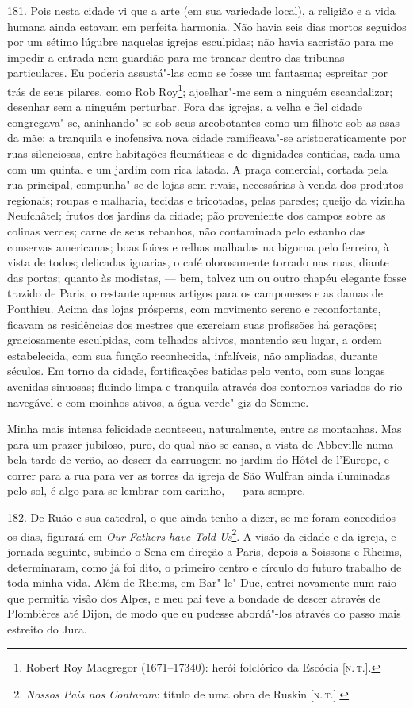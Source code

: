 181. Pois nesta cidade vi que a arte (em sua variedade local), a
religião e a vida humana ainda estavam em perfeita harmonia. Não havia
seis dias mortos seguidos por um sétimo lúgubre naquelas igrejas
esculpidas; não havia sacristão para me impedir a entrada nem guardião
para me trancar dentro das tribunas particulares. Eu poderia assustá"-las
como se fosse um fantasma; espreitar por trás de seus pilares, como Rob
Roy\footnote{Robert Roy Macgregor (1671--17340): herói folclórico da
  Escócia {[}\textsc{n.\,t.}{]}.}; ajoelhar"-me sem a ninguém escandalizar;
desenhar sem a ninguém perturbar. Fora das igrejas, a velha e fiel
cidade congregava"-se, aninhando"-se sob seus arcobotantes como um filhote
sob as asas da mãe; a tranquila e inofensiva nova cidade ramificava"-se
aristocraticamente por ruas silenciosas, entre habitações fleumáticas e
de dignidades contidas, cada uma com um quintal e um jardim com rica
latada. A praça comercial, cortada pela rua principal, compunha"-se de
lojas sem rivais, necessárias à venda dos produtos regionais; roupas e
malharia, tecidas e tricotadas, pelas paredes; queijo da vizinha
Neufchâtel; frutos dos jardins da cidade; pão proveniente dos campos
sobre as colinas verdes; carne de seus rebanhos, não contaminada pelo
estanho das conservas americanas; boas foices e relhas malhadas na
bigorna pelo ferreiro, à vista de todos; delicadas iguarias, o café
olorosamente torrado nas ruas, diante das portas; quanto às modistas, ---
bem, talvez um ou outro chapéu elegante fosse trazido de Paris, o
restante apenas artigos para os camponeses e as damas de Ponthieu. Acima
das lojas prósperas, com movimento sereno e reconfortante, ficavam as
residências dos mestres que exerciam suas profissões há gerações;
graciosamente esculpidas, com telhados altivos, mantendo seu lugar, a
ordem estabelecida, com sua função reconhecida, infalíveis, não
ampliadas, durante séculos. Em torno da cidade, fortificações batidas
pelo vento, com suas longas avenidas sinuosas; fluindo limpa e tranquila
através dos contornos variados do rio navegável e com moinhos ativos, a
água verde"-giz do Somme.

Minha mais intensa felicidade aconteceu, naturalmente, entre as
montanhas. Mas para um prazer jubiloso, puro, do qual não se cansa, a
vista de Abbeville numa bela tarde de verão, ao descer da carruagem no
jardim do Hôtel de l'Europe, e correr para a rua para ver as torres da
igreja de São Wulfran ainda iluminadas pelo sol, é algo para se lembrar
com carinho, --- para sempre.

182. De Ruão e sua catedral, o que ainda tenho a dizer, se me foram
concedidos os dias, figurará em \emph{Our Fathers have Told
Us}\footnote{\emph{Nossos Pais nos Contaram}: título de uma obra de
  Ruskin {[}\textsc{n.\,t.}{]}.}. A visão da cidade e da igreja, e jornada
seguinte, subindo o Sena em direção a Paris, depois a Soissons e Rheims,
determinaram, como já foi dito, o primeiro centro e círculo do futuro
trabalho de toda minha vida. Além de Rheims, em Bar"-le"-Duc, entrei
novamente num raio que permitia visão dos Alpes, e meu pai teve a
bondade de descer através de Plombières até Dijon, de modo que eu
pudesse abordá"-los através do passo mais estreito do Jura.

